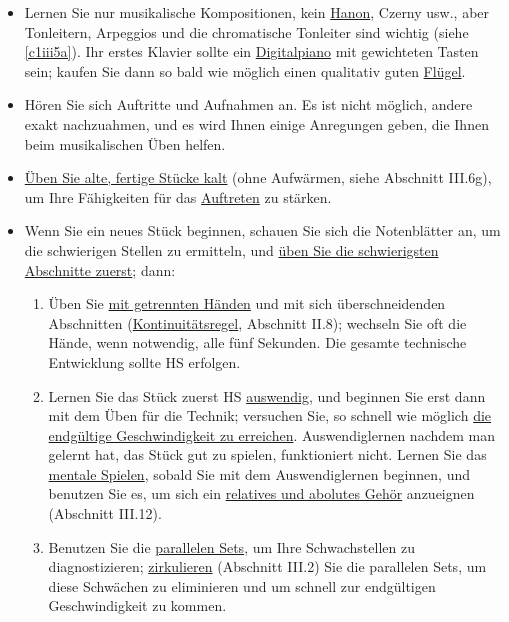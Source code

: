 \begin{itemize} 
\item Lernen Sie nur musikalische Kompositionen, kein \hyperref[c1iii7h]{Hanon}, Czerny usw., aber Tonleitern, Arpeggios und die chromatische Tonleiter sind wichtig (siehe \hyperref[c1iii5a]{\autoref{c1iii5a}}).
Ihr erstes Klavier sollte ein \hyperref[c1iii17b]{Digitalpiano} mit gewichteten Tasten sein; kaufen Sie dann so bald wie möglich einen qualitativ guten \hyperref[c1iii17d]{Flügel}.

\item Hören Sie sich Auftritte und Aufnahmen an.
Es ist nicht möglich, andere exakt nachzuahmen, und es wird Ihnen einige Anregungen geben, die Ihnen beim musikalischen Üben helfen.

\item \hyperref[c1iii6g]{Üben Sie alte, fertige Stücke kalt} (ohne Aufwärmen, siehe Abschnitt III.6g), um Ihre Fähigkeiten für das \hyperref[c1iii14]{Auftreten} zu stärken.

\item Wenn Sie ein neues Stück beginnen, schauen Sie sich die Notenblätter an, um die schwierigen Stellen zu ermitteln, und \hyperref[c1ii5]{üben Sie die schwierigsten Abschnitte zuerst}; dann:

 \begin{enumerate}[label={\alph*.}] 
 \item Üben Sie \hyperref[c1ii7]{mit getrennten Händen} und mit sich überschneidenden Abschnitten (\hyperref[c1ii8]{Kontinuitätsregel}, Abschnitt II.8); wechseln Sie oft die Hände, wenn notwendig, alle fünf Sekunden.
Die gesamte technische Entwicklung sollte HS erfolgen.
 
 \item Lernen Sie das Stück zuerst HS \hyperref[c1iii6]{auswendig}, und beginnen Sie erst dann mit dem Üben für die Technik; versuchen Sie, so schnell wie möglich \hyperref[c1iii7i]{die endgültige Geschwindigkeit zu erreichen}.
Auswendiglernen nachdem man gelernt hat, das Stück gut zu spielen, funktioniert nicht.
Lernen Sie das \hyperref[c1ii12mental]{mentale Spielen}, sobald Sie mit dem Auswendiglernen beginnen, und benutzen Sie es, um sich ein \hyperref[c1iii12]{relatives und abolutes Gehör} anzueignen (Abschnitt III.12).
 
 \item Benutzen Sie die \hyperref[c1ii11]{parallelen Sets}, um Ihre Schwachstellen zu diagnostizieren; \hyperref[c1iii2]{zirkulieren} (Abschnitt III.2) Sie die parallelen Sets, um diese Schwächen zu eliminieren und um schnell zur endgültigen Geschwindigkeit zu kommen.
 

\end{enumerate}
\end{itemize}
